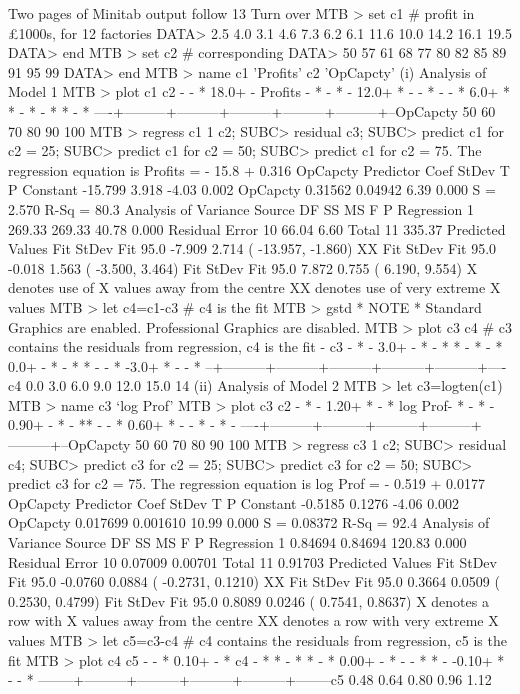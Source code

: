 \documentclass[a4paper,12pt]{article}
\begin{document}
\newpage
\begin{framed}
Two pages of Minitab output follow
13 Turn over
MTB > set c1 # profit in £1000s, for 12 factories
DATA> 2.5 4.0 3.1 4.6 7.3 6.2 6.1 11.6 10.0 14.2 16.1 19.5 DATA> end
MTB > set c2 # corresponding %
DATA> 50 57 61 68 77 80 82 85 89 91 95 99 DATA> end
MTB > name c1 'Profits' c2 'OpCapcty'
(i) Analysis of Model 1
MTB > plot c1 c2
-
- *
18.0+
-
Profits - *
- *
-
12.0+ *
-
- *
-
- *
6.0+ * *
- *
- * *
- *
----+---------+---------+---------+---------+---------+--OpCapcty
50 60 70 80 90 100
MTB > regress c1 1 c2;
SUBC> residual c3;
SUBC> predict c1 for c2 = 25; SUBC> predict c1 for c2 = 50; SUBC> predict c1 for c2 = 75.
The regression equation is Profits = - 15.8 + 0.316 OpCapcty
Predictor Coef StDev T P
Constant -15.799 3.918 -4.03 0.002
OpCapcty 0.31562 0.04942 6.39 0.000
S = 2.570 R-Sq = 80.3%
Analysis of Variance
Source DF SS MS F P
Regression 1 269.33 269.33 40.78 0.000
Residual Error 10 66.04 6.60
Total 11 335.37
Predicted Values
Fit StDev Fit 95.0%
-7.909 2.714 ( -13.957, -1.860) XX
Fit StDev Fit 95.0%
-0.018 1.563 ( -3.500, 3.464)
Fit StDev Fit 95.0%
7.872 0.755 ( 6.190, 9.554)
X denotes use of X values away from the centre
XX denotes use of very extreme X values
MTB > let c4=c1-c3 # c4 is the fit
MTB > gstd
* NOTE * Standard Graphics are enabled. Professional Graphics are disabled.
MTB > plot c3 c4 # c3 contains the residuals from regression, c4 is the fit
-
c3 - *
-
3.0+
- *
- * *
- *
- *
0.0+
- *
- * *
-
- *
-3.0+ *
-
- *
--+---------+---------+---------+---------+---------+----c4
0.0 3.0 6.0 9.0 12.0 15.0
14
(ii) Analysis of Model 2
MTB > let c3=logten(c1)
MTB > name c3 ‘log Prof’
MTB > plot c3 c2
- *
-
1.20+ *
- *
log Prof- *
- *
-
0.90+
- *
- **
-
- *
0.60+ *
-
- *
- *
-
----+---------+---------+---------+---------+---------+--OpCapcty
50 60 70 80 90 100
MTB > regress c3 1 c2;
SUBC> residual c4;
SUBC> predict c3 for c2 = 25; SUBC> predict c3 for c2 = 50; SUBC> predict c3 for c2 = 75.
The regression equation is log Prof = - 0.519 + 0.0177 OpCapcty
Predictor Coef StDev T P
Constant -0.5185 0.1276 -4.06 0.002
OpCapcty 0.017699 0.001610 10.99 0.000
S = 0.08372 R-Sq = 92.4%
Analysis of Variance
Source DF SS MS F P
Regression 1 0.84694 0.84694 120.83 0.000
Residual Error 10 0.07009 0.00701
Total 11 0.91703
Predicted Values
Fit StDev Fit 95.0%
-0.0760 0.0884 ( -0.2731, 0.1210) XX
Fit StDev Fit 95.0%
0.3664 0.0509 ( 0.2530, 0.4799)
Fit StDev Fit 95.0%
0.8089 0.0246 ( 0.7541, 0.8637)
X denotes a row with X values away from the centre
XX denotes a row with very extreme X values
MTB > let c5=c3-c4 # c4 contains the residuals from regression, c5 is the fit
MTB > plot c4 c5
-
- *
0.10+
- *
c4 - * *
- * *
- *
0.00+
- *
-
- * *
-
-0.10+ *
-
- *
--------+---------+---------+---------+---------+--------c5
0.48 0.64 0.80 0.96 1.12



\end{framed}
\end{document}
